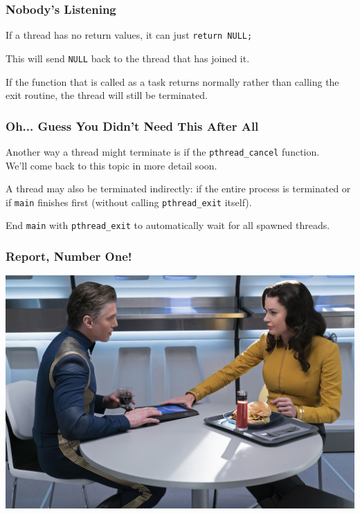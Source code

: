 \begin{frame}
	\frametitle{Nobody's Listening}

	If a thread has no return values, it can just \texttt{return NULL;}

	This will send \texttt{NULL} back to the thread that has joined it.

	If the function that is called as a task returns normally rather than calling the exit routine, the thread will still be terminated.

\end{frame}

\begin{frame}
	\frametitle{Oh... Guess You Didn't Need This After All}

	Another way a thread might terminate is if the \texttt{pthread\_cancel} function.\\
	\quad We'll come back to this topic in more detail soon.

	A thread may also be terminated indirectly: if the entire process is terminated or if \texttt{main} finishes first (without calling \texttt{pthread\_exit} itself).

	End \texttt{main} with \texttt{pthread\_exit} to automatically wait for all spawned threads.

\end{frame}


\begin{frame}
\frametitle{Report, Number One!}

\begin{center}
	\includegraphics[width=\textwidth]{images/pike-numberone.jpg}
\end{center}

\end{frame}


